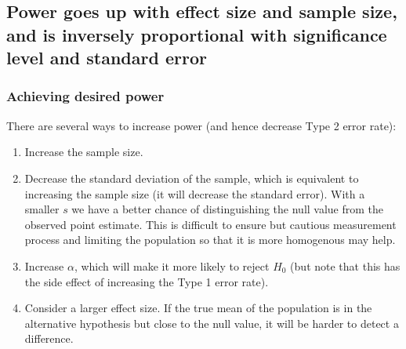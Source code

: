 \documentclass[slidestop,compress,mathserif,12pt,t,professionalfonts,xcolor=table]{beamer}
\begin{document}

\subsection{Power goes up with effect size and sample size, and is inversely proportional
with significance level and standard error}
\label{mi5}


\begin{frame}
\frametitle{Achieving desired power}

There are several ways to increase power (and hence decrease Type 2 error rate):

\pause

\begin{enumerate}

\item Increase the sample size.

\pause

\item Decrease the standard deviation of the sample, which is equivalent to increasing the 
sample size (it will decrease the standard error). With a smaller $s$ we have a better chance 
of distinguishing the null value from the observed point estimate. This is difficult to ensure but 
cautious measurement process and limiting the population so that it is more homogenous may help.

\pause

\item Increase $\alpha$, which will make it more likely to reject $H_0$ (but note that this has the 
side effect of increasing the Type 1 error rate).

\pause

\item Consider a larger effect size. If the true mean of the population is in the alternative hypothesis 
but close to the null value, it will be harder to detect a difference.

\end{enumerate}

\end{frame}

\end{document}
